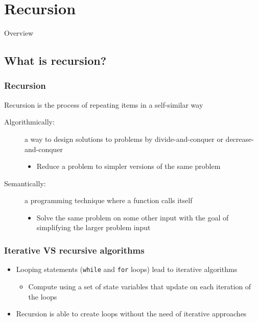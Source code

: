 \documentclass[11pt]{beamer}
\begin{document}
\section{Recursion}

\begin{frame}{Overview}
\end{frame}

\subsection{What is recursion?}
\begin{frame}\frametitle{Recursion}
\begin{block}{}
Recursion is the process of repeating items in a self-similar way
\end{block}
\begin{description}
\item[Algorithmically:] a way to design solutions to problems by divide-and-conquer or decrease-and-conquer
\begin{itemize}
\item Reduce a problem to simpler versions of the same problem
\end{itemize}
\item[Semantically:] a programming technique where a function calls itself
\begin{itemize}
\item Solve the same problem on some other input with the goal of simplifying the larger problem input
\end{itemize}
\end{description}
\end{frame}

\begin{frame}\frametitle{Iterative VS recursive algorithms}
\begin{itemize}
\item Looping statements (\texttt{while} and \texttt{for} loops) lead to iterative algorithms
\begin{itemize}
\item Compute using a set of state variables that update on each iteration of the loops
\end{itemize}
\item Recursion is able to create loops without the need of iterative approaches
\end{itemize}
\end{frame}
\end{document}
